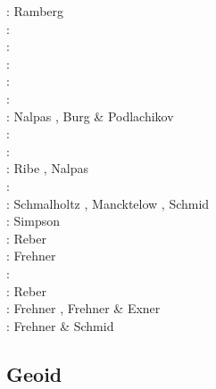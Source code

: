 \begin{scriptsize}
\nineteenseventy: Ramberg \cite{ramb70}\\
\nineteenseventyone: \cite{ramb71}\\
\nineteenninetyone: \cite{flet91}\\
\nineteenninetythree: \cite{zhhj93}\\
\nineteenninetyfive: \cite{flet95}\\
\nineteenninetysix: \cite{zhho96}\\
\nineteenninetynine: Nalpas \etal \cite{nagg99}, Burg \& Podlachikov \cite{bupo99}\\
\twothousandone: \cite{scpo01}\\
\twothousandtwo: \cite{mumh02}\\
\twothousandthree: Ribe \cite{ribe03}, Nalpas \etal \cite{nagv03}\\
\twothousandsix: \cite{frsc06}\\
\twothousandeight: Schmalholtz \cite{schm08}, Mancktelow \cite{manc08}, Schmid \etal \cite{scdk08}\\
\twothousandnine: Simpson \cite{simp09}\\
\twothousandten: Reber \etal \cite{resb10}\\
\twothousandeleven: Frehner \cite{freh11}\\
\twothousandtwelve: \cite{reds12}\cite{grsc12}\cite{scsc12}\\
\twothousandthirteen: Reber \etal \cite{regc13}\\
\twothousandfourteen: Frehner \cite{freh14}, Frehner \& Exner \cite{frex14}\\
\twothousandsixteen: Frehner \& Schmid \cite{frsc16}
\end{scriptsize}

\subsection{Geoid}

